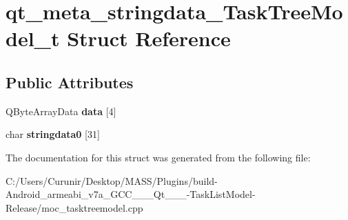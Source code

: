 \hypertarget{structqt__meta__stringdata___task_tree_model__t}{}\section{qt\+\_\+meta\+\_\+stringdata\+\_\+\+Task\+Tree\+Model\+\_\+t Struct Reference}
\label{structqt__meta__stringdata___task_tree_model__t}
\subsection*{Public Attributes}
\begin{DoxyCompactItemize}
\item 
\mbox{\label{structqt__meta__stringdata___task_tree_model__t_a5176d01b7f606f52d824d5d74f71e930}} 
Q\+Byte\+Array\+Data {\bfseries data} \mbox{[}4\mbox{]}
\item 
\mbox{\label{structqt__meta__stringdata___task_tree_model__t_a87a9aab03824bdaffc5cda396fa16eb9}} 
char {\bfseries stringdata0} \mbox{[}31\mbox{]}
\end{DoxyCompactItemize}


The documentation for this struct was generated from the following file\+:\begin{DoxyCompactItemize}
\item 
C\+:/\+Users/\+Curunir/\+Desktop/\+M\+A\+S\+S/\+Plugins/build-\/\+Android\+\_\+armeabi\+\_\+v7a\+\_\+\+G\+C\+C\+\_\+\_\+\_\+\+Qt\+\_\+\_\+\_-\/\+Task\+List\+Model-\/\+Release/moc\+\_\+tasktreemodel.\+cpp\end{DoxyCompactItemize}
